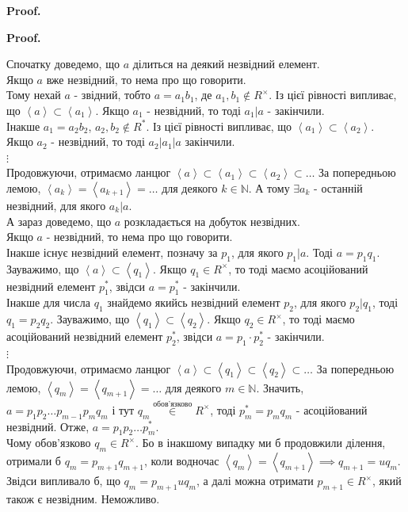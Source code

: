 \documentclass[a4paper, 10pt]{article}
\makeatletter
\theoremstyle{theoremdd}
\theoremstyle{theoremdd}
\theoremstyle{theoremdd}
\theoremstyle{theoremdd}
\theoremstyle{theoremdd}
\theoremstyle{theoremdd}
\theoremstyle{theoremdd}
\theoremstyle{theoremdd}
\renewenvironment{proof}[1][Proof.\\]{\par
\pushQED{\hfill \qed}%
\normalfont \topsep6\p@\@plus6\p@\relax
\trivlist
\item\relax
{\bfseries
#1\@addpunct{.}}\hspace\labelsep\ignorespaces
}{%
\popQED\endtrivlist\@endpefalse
}
\makeatother
\begin{document}
\begin{proof}
\begin{proof}
Спочатку доведемо, що $a$ ділиться на деякий незвідний елемент.\\
Якщо $a$ вже незвідний, то нема про що говорити.\\
Тому нехай $a$ - звідний, тобто $a = a_1b_1$, де $a_1,b_1 \not \in R^\times$. Із цієї рівності випливає, що $\left<a  \right> \subset \left< a_1 \right>$. Якщо $a_1$ - незвідний, то тоді $a_1 | a$ - закінчили.\\
Інакше $a_1 = a_2b_2$, $a_2,b_2 \not\in R^*$. Із цієї рівності випливає, що $\left<a_1 \right> \subset \left< a_2 \right>$.\\
Якщо $a_2$ - незвідний, то тоді $a_2 | a_1 | a$ закінчили.\\
$\vdots$\\
Продовжуючи, отримаємо ланцюг $\left< a \right> \subset \left< a_1 \right> \subset \left< a_2 \right> \subset \dots$ За попередньою лемою, $\left< a_k \right> = \left< a_{k+1} \right> = \dots$ для деякого $k \in \mathbb{N}$. А тому $\exists a_k$ - останній незвідний, для якого $a_k | a$.
\bigskip \\
А зараз доведемо, що $a$ розкладається на добуток незвідних.\\
Якщо $a$ - незвідний, то нема про що говорити.\\
Інакше існує незвідний елемент, позначу за $p_1$, для якого $p_1 | a$. Тоді $a = p_1 q_1$. Зауважимо, що $\left< a \right> \subset \left< q_1\right>$. Якщо $q_1 \in R^\times$, то тоді маємо асоційований незвідний елемент $p_1^*$, звідси $a = p_1^*$ - закінчили.\\
Інакше для числа $q_1$ знайдемо якийсь незвідний елемент $p_2$, для якого $p_2 | q_1$, тоді $q_1 = p_2 q_2$. Зауважимо, що $\left< q_1 \right> \subset \left< q_2 \right>$. Якщо $q_2 \in R^\times$, то тоді маємо асоційований незвідний елемент $p_2^*$, звідси $a = p_1 \cdot p_2^*$ - закінчили.\\
$\vdots$\\
Продовжуючи, отримаємо ланцюг $\left< a \right> \subset \left< q_1 \right> \subset \left< q_2 \right> \subset \dots$ За попередньою лемою, $\left< q_m \right> = \left< q_{m+1} \right> = \dots$ для деякого $m \in \mathbb{N}$. Значить, $a = p_1 p_2 \dots p_{m-1}p_mq_m$ і тут $q_m \overset{\text{обов'язково}}{\in} R^\times$, тоді $p_m^* = p_mq_m$ - асоційований незвідний. Отже, $a = p_1p_2\dots p_m^*$.\\
Чому обов'язково $q_m \in R^\times$. Бо в інакшому випадку ми б продовжили ділення, отримали б $q_m = p_{m+1}q_{m+1}$, коли водночас $\left< q_m \right> = \left< q_{m+1} \right> \implies q_{m+1} = uq_m$. Звідси випливало б, що $q_m = p_{m+1}uq_m$, а далі можна отримати $p_{m+1} \in R^\times$, який також є незвідним. Неможливо.
\end{proof}


\end{proof}
\end{document}
